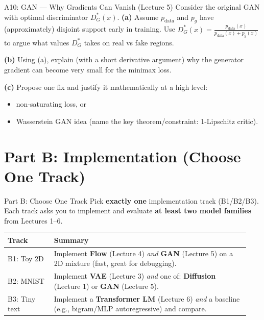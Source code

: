 \documentclass[aspectratio=169]{beamer}
\begin{document}
\begin{frame}{A10: GAN --- Why Gradients Can Vanish (Lecture 5)}
\small
Consider the original GAN with optimal discriminator $D^*_G(x)$.
\textbf{(a)} Assume $p_{\text{data}}$ and $p_g$ have (approximately) disjoint support early in training.
Use $D^*_G(x)=\frac{p_{\text{data}}(x)}{p_{\text{data}}(x)+p_g(x)}$ to argue what values $D^*_G$ takes on real vs fake regions.
\vspace{0.3em}

\textbf{(b)} Using (a), explain (with a short derivative argument) why the generator gradient can become very small for the minimax loss.
\vspace{0.3em}

\textbf{(c)} Propose one fix and justify it mathematically at a high level:
\begin{itemize}
  \item non-saturating loss, or
  \item Wasserstein GAN idea (name the key theorem/constraint: 1-Lipschitz critic).
\end{itemize}
\end{frame}

\section{Part B: Implementation (Choose One Track)}

\begin{frame}{Part B: Choose One Track}
\small
Pick \textbf{exactly one} implementation track (B1/B2/B3). Each track asks you to implement and evaluate \textbf{at least two model families} from Lectures 1--6.
\vspace{0.75em}

\begin{tabular}{@{}p{0.18\linewidth}p{0.76\linewidth}@{}}
\toprule
\textbf{Track} & \textbf{Summary} \\
\midrule
B1: Toy 2D & Implement \textbf{Flow} (Lecture 4) \emph{and} \textbf{GAN} (Lecture 5) on a 2D mixture (fast, great for debugging). \\
B2: MNIST & Implement \textbf{VAE} (Lecture 3) \emph{and} one of: \textbf{Diffusion} (Lecture 1) or \textbf{GAN} (Lecture 5). \\
B3: Tiny text & Implement a \textbf{Transformer LM} (Lecture 6) \emph{and} a baseline (e.g., bigram/MLP autoregressive) and compare. \\
\bottomrule
\end{tabular}
\end{frame}
\end{document}
